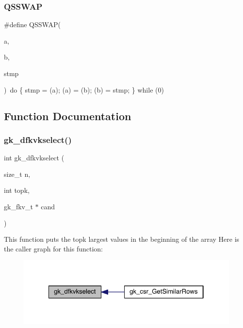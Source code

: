 \subsubsection{\texorpdfstring{Q\+S\+S\+W\+AP}{QSSWAP}}
{\footnotesize\ttfamily \#define Q\+S\+S\+W\+AP(\begin{DoxyParamCaption}\item[{}]{a,  }\item[{}]{b,  }\item[{}]{stmp }\end{DoxyParamCaption})~do \{ stmp = (a); (a) = (b); (b) = stmp; \} while (0)}



\subsection{Function Documentation}
\mbox{\label{a00032_a5883bd40338c9bc48b10124cf32ad7ba}} 
\subsubsection{\texorpdfstring{gk\+\_\+dfkvkselect()}{gk\_dfkvkselect()}}
{\footnotesize\ttfamily int gk\+\_\+dfkvkselect (\begin{DoxyParamCaption}\item[{size\+\_\+t}]{n,  }\item[{int}]{topk,  }\item[{gk\+\_\+fkv\+\_\+t $\ast$}]{cand }\end{DoxyParamCaption})}

This function puts the \textquotesingle{}topk\textquotesingle{} largest values in the beginning of the array Here is the caller graph for this function\+:\nopagebreak
\begin{figure}[H]
\begin{center}
\leavevmode
\includegraphics[width=322pt]{a00032_a5883bd40338c9bc48b10124cf32ad7ba_icgraph}
\end{center}
\end{figure}
\mbox{\label{a00032_a394b3af52f2cb86fa857ee027a3a443f}} 
